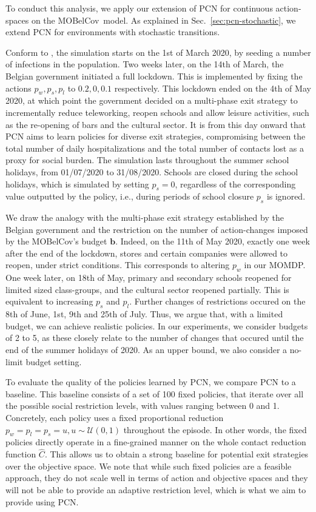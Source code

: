 \documentclass{article}
\newcommand{\momdpname}{MOBelCov}
\newcommand{\budget}{\bm{b}}
\begin{document}
To conduct this analysis, we apply our extension of PCN for continuous action-spaces on the \momdpname\ model. As explained in Sec.~\ref{sec:pcn-stochastic}, we extend PCN for environments with stochastic transitions.

Conform to \citet{abrams2021modelling}, the simulation starts on the 1st of March 2020, by seeding a number of infections in the population. Two weeks later, on the 14th of March, the Belgian government initiated a full lockdown. This is implemented by fixing the actions $p_w, p_s, p_l$ to $0.2, 0, 0.1$ respectively. This lockdown ended on the 4th of May 2020, at which point the government decided on a multi-phase exit strategy to incrementally reduce teleworking, reopen schools and allow leisure activities, such as the re-opening of bars and the cultural sector. It is from this day onward that PCN aims to learn policies for diverse exit strategies, compromising between the total number of daily hospitalizations and the total number of contacts lost as a proxy for social burden. The simulation lasts throughout the summer school holidays, from 01/07/2020 to 31/08/2020. Schools are closed during the school holidays, which is simulated by setting $p_s = 0$, regardless of the corresponding value outputted by the policy, i.e., during periods of school closure $p_s$ is ignored.

We draw the analogy with the multi-phase exit strategy established by the Belgian government and the restriction on the number of action-changes imposed by the \momdpname's budget $\budget$. Indeed, on the 11th of May 2020, exactly one week after the end of the lockdown, stores and certain companies were allowed to reopen, under strict conditions. This corresponds to altering $p_w$ in our MOMDP. One week later, on 18th of May, primary and secondary schools reopened for limited sized class-groups, and the cultural sector reopened partially. This is equivalent to increasing $p_s$ and $p_l$. Further changes of restrictions occured on the 8th of June, 1st, 9th and 25th of July. Thus, we argue that, with a limited budget, we can achieve realistic policies. In our experiments, we consider budgets of 2 to 5, as these closely relate to the number of changes that occured until the end of the summer holidays of 2020. As an upper bound, we also consider a no-limit budget setting.

To evaluate the quality of the policies learned by PCN, we compare PCN to a baseline. This baseline consists of a set of 100 fixed policies, that iterate over all the possible social restriction levels, with values ranging between 0 and 1. Concretely, each policy uses a fixed proportional reduction $p_w=p_l=p_s=u, u\sim\mathcal{U}(0, 1)$ throughout the episode. In other words, the fixed policies directly operate in a fine-grained manner on the whole contact reduction function $\hat{C}$. This allows us to obtain a strong baseline for potential exit strategies over the objective space. We note that while such fixed policies are a feasible approach, they do not scale well in terms of action and objective spaces and they will not be able to provide an adaptive restriction level, which is what we aim to provide using PCN.
\end{document}
